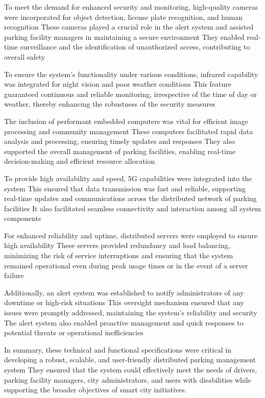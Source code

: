 \documentclass[oneside, 12pt, a4paper, draft]{book}
\begin{document}
To meet the demand for enhanced security and monitoring, high-quality cameras were incorporated for object detection, license plate recognition, and human recognition
These cameras played a crucial role in the alert system and assisted parking facility managers in maintaining a secure environment
They enabled real-time surveillance and the identification of unauthorized access, contributing to overall safety

To ensure the system's functionality under various conditions, infrared capability was integrated for night vision and poor weather conditions
This feature guaranteed continuous and reliable monitoring, irrespective of the time of day or weather, thereby enhancing the robustness of the security measures

The inclusion of performant embedded computers was vital for efficient image processing and community management
These computers facilitated rapid data analysis and processing, ensuring timely updates and responses
They also supported the overall management of parking facilities, enabling real-time decision-making and efficient resource allocation

To provide high availability and speed, 5G capabilities were integrated into the system
This ensured that data transmission was fast and reliable, supporting real-time updates and communications across the distributed network of parking facilities
It also facilitated seamless connectivity and interaction among all system components

For enhanced reliability and uptime, distributed servers were employed to ensure high availability
These servers provided redundancy and load balancing, minimizing the risk of service interruptions and ensuring that the system remained operational even during peak usage times or in the event of a server failure

Additionally, an alert system was established to notify administrators of any downtime or high-risk situations
This oversight mechanism ensured that any issues were promptly addressed, maintaining the system's reliability and security
The alert system also enabled proactive management and quick responses to potential threats or operational inefficiencies

In summary, these technical and functional specifications were critical in developing a robust, scalable, and user-friendly distributed parking management system
They ensured that the system could effectively meet the needs of drivers, parking facility managers, city administrators, and users with disabilities while supporting the broader objectives of smart city initiatives.
\end{document}
